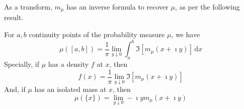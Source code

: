 As a transform, $m_{\mu}$ has an inverse formula to recover $\mu$, as per the following result.

\begin{theorem} \label{thm:inverse-stieltjes-transform}
	For $a,b$ continuity points of the probability measure $\mu$, we have
	\begin{equation}
		\mu\left([a,b]\right)=\frac{1}{\pi}\lim_{y\downarrow 0}\int_{a}^{b}\Im\left[m_{\mu}(x+\imath y)\right]\,\mathrm{d}x
	\end{equation}
	Specially, if $\mu$ has a density $f$ at $x$, then
	\begin{equation}
		f(x)=\frac{1}{\pi}\lim_{y\downarrow 0}\Im\left[m_{\mu}(x+\imath y)\right]
	\end{equation}
	And, if $\mu$ has an isolated mass at $x$, then
	\begin{equation}
		\mu(\{x\})=\lim_{y \downarrow 0}-\imath y m_{\mu}(x+\imath y)
	\end{equation}
\end{theorem}

